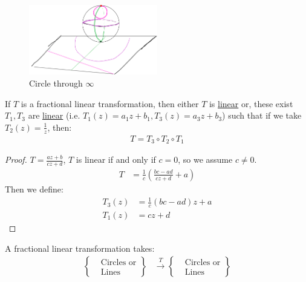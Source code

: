 \begin{figure}[H]
    \centering
    \includegraphics[width=0.5\textwidth]{LECTURE_16/circle-through-infty.png}
    \caption{Circle through $\infty$}
\end{figure}

\begin{lemma}
    If $T$ is a fractional linear transformation, then either $T$ is \underline{linear} or, these exist $T_1, T_3$ are \underline{linear} (i.e. $T_1(z) = a_1z + b_1, T_3(z) = a_3z + b_3$) such that if we take $T_2(z) = \frac{1}{z}$, then:
    \begin{align*}
        T = T_3 \circ T_2 \circ T_1
    \end{align*}
\end{lemma}

\begin{proof}
    $T= \frac{az + b}{cz + d}$, $T$ is linear if and only if $c = 0$, so we assume $c \neq 0$.\\
    \begin{align*}
        T & = \frac{1}{c} \left(\frac{bc - ad}{cz + d} + a\right)
    \end{align*}
    Then we define:
    \begin{align*}
        T_3(z) & = \frac{1}{c} (bc - ad)z + a \\
        T_1(z) & = cz + d
    \end{align*}
\end{proof}

\begin{corollary}
    A fractional linear transformation takes:
    \begin{align*}
        \left\{
        \begin{aligned}
             & \text{Circles or} \\
             & \text{Lines}
        \end{aligned}
        \right\}
         & \xrightarrow{T}
        \left\{
        \begin{aligned}
             & \text{Circles or} \\
             & \text{Lines}
        \end{aligned}
        \right\}
    \end{align*}
\end{corollary}

